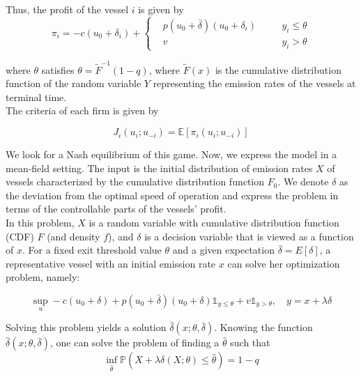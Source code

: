\documentclass[a4paper,12pt]{article}
\begin{document}
Thus, the profit of the vessel $i$ is given by
\begin{equation}
	\pi_i = -c(u_0+\delta_i) +
	\left\{
	\begin{alignedat}{2}
		&p(u_0+\bar{\delta})(u_0+\delta_i) \quad && y_i \leq \theta \\
		&v \quad && y_i  > \theta
	\end{alignedat}
	\right.
\end{equation}

where $\theta$ satisfies $\theta = \tilde{F}^{-1}(1 - q)$, where $\tilde{F}(x)$ is the cumulative distribution function of the random variable $Y$ representing the emission rates of the vessels at terminal time.\\

The criteria of each firm is given by

\begin{equation}
	\label{eq:criteria1}
	J_i(u_i;u_{-i})=\mathbb{E}[\pi_i(u_i;u_{-i})]
\end{equation}

We look for a Nash equilibrium of this game.
Now, we express the model in a mean-field setting.
The input is the initial distribution of emission rates $X$ of vessels characterized by the cumulative distribution function $F_0$.
We denote $\delta$ as the deviation from the optimal speed of operation and express the problem in terms of the controllable parts of the vessels' profit.\\

In this problem, $X$ is a random variable with cumulative distribution function (CDF) $F$ (and density $f$), and $\delta$ is a decision variable that is viewed as a function of $x$. For a fixed exit threshold value $\theta$ and a given expectation $\bar{\delta} = E[\delta]$, a representative vessel with an initial emission rate $x$ can solve her optimization problem, namely:

\begin{equation}
	\label{eq:sup}
	\operatorname*{sup}_{u}-c(u_0+\delta)+p(u_0+\bar{\delta})(u_0+\delta)\mathds{1}_{y\leq \theta}+v\mathds{1}_{y>\theta}, \quad y=x+\lambda \delta
\end{equation}

Solving this problem yields a solution $\hat{\delta}(x; \theta, \bar{\delta})$.
Knowing the function $\hat{\delta}(x; \theta, \bar{\delta})$, one can solve the problem of finding a $\hat{\theta}$ such that
\begin{equation}
	\operatorname*{inf}_{\hat{\theta}} \mathbb{P}(X+\lambda \delta(X;\theta)\leq \hat{\theta}) =1-q
	\label{eq:theta}
\end{equation}
\end{document}
